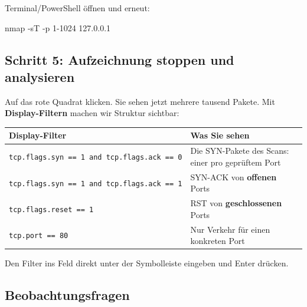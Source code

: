 \documentclass[
  nswissgerman,
  a4paper,
  DIV=11,
  numbers=noendperiod,
  ngerman]{scrreprt}
\newenvironment{Shaded}{\begin{snugshade}}{\end{snugshade}}
\newcommand{\AttributeTok}[1]{\textcolor[rgb]{0.40,0.45,0.13}{#1}}
\newcommand{\FunctionTok}[1]{\textcolor[rgb]{0.28,0.35,0.67}{#1}}
\newcommand{\NormalTok}[1]{\textcolor[rgb]{0.00,0.23,0.31}{#1}}
\newcounter{none} %
\begin{document}
Terminal/PowerShell öffnen und erneut:

\begin{Shaded}
\begin{Highlighting}[numbers=left,,]
\FunctionTok{nmap} \AttributeTok{{-}sT} \AttributeTok{{-}p}\NormalTok{ 1{-}1024 127.0.0.1}
\end{Highlighting}
\end{Shaded}

\subsection{Schritt 5: Aufzeichnung stoppen und
analysieren}\label{schritt-5-aufzeichnung-stoppen-und-analysieren}

Auf das rote Quadrat klicken. Sie sehen jetzt mehrere tausend Pakete.
Mit \textbf{Display-Filtern} machen wir Struktur sichtbar:

{\def\LTcaptype{none} %
\begin{longtable}[]{@{}
  >{\raggedright\arraybackslash}p{}
  >{\raggedright\arraybackslash}p{}@{}}
\toprule\noalign{}
\begin{minipage}[b]{\linewidth}\raggedright
Display-Filter
\end{minipage} & \begin{minipage}[b]{\linewidth}\raggedright
Was Sie sehen
\end{minipage} \\
\midrule\noalign{}
\endhead
\bottomrule\noalign{}
\endlastfoot
\texttt{tcp.flags.syn\ ==\ 1\ and\ tcp.flags.ack\ ==\ 0} & Die
SYN-Pakete des Scans: einer pro geprüftem Port \\
\texttt{tcp.flags.syn\ ==\ 1\ and\ tcp.flags.ack\ ==\ 1} & SYN-ACK von
\textbf{offenen} Ports \\
\texttt{tcp.flags.reset\ ==\ 1} & RST von \textbf{geschlossenen}
Ports \\
\texttt{tcp.port\ ==\ 80} & Nur Verkehr für einen konkreten Port \\
\end{longtable}
}

Den Filter ins Feld direkt unter der Symbolleiste eingeben und Enter
drücken.

\subsection{Beobachtungsfragen}\label{beobachtungsfragen-2}
\end{document}
